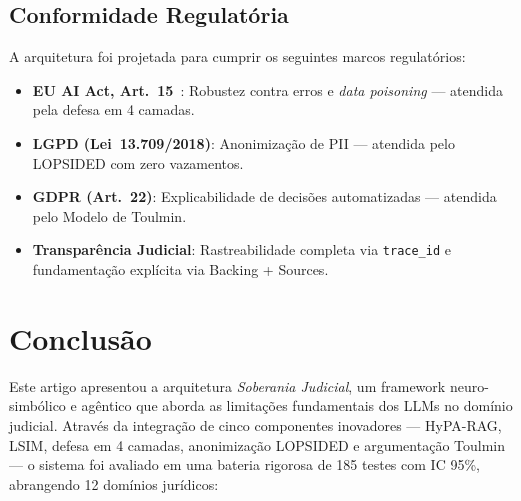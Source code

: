 \documentclass[journal,10pt]{IEEEtran}
\begin{document}
\subsection{Conformidade Regulat\'{o}ria}

A arquitetura foi projetada para cumprir os seguintes marcos regulat\'{o}rios:

\begin{itemize}    \item \textbf{EU AI Act, Art.~15}~\cite{euaiact2024,euaiactsd2024}: Robustez contra erros e \textit{data poisoning} --- atendida pela defesa em 4 camadas.
    \item \textbf{LGPD (Lei~13.709/2018)}: Anonimiza\c{c}\~{a}o de PII --- atendida pelo LOPSIDED com zero vazamentos.
    \item \textbf{GDPR (Art.~22)}: Explicabilidade de decis\~{o}es automatizadas --- atendida pelo Modelo de Toulmin.
    \item \textbf{Transpar\^{e}ncia Judicial}: Rastreabilidade completa via \texttt{trace\_id} e fundamenta\c{c}\~{a}o expl\'{i}cita via Backing + Sources.
\end{itemize}

\section{Conclus\~{a}o}

Este artigo apresentou a arquitetura \textit{Soberania Judicial}, um framework neuro-simb\'{o}lico e ag\^{e}ntico que aborda as limita\c{c}\~{o}es fundamentais dos LLMs no dom\'{i}nio judicial. Atrav\'{e}s da integra\c{c}\~{a}o de cinco componentes inovadores --- HyPA-RAG, LSIM, defesa em 4 camadas, anonimiza\c{c}\~{a}o LOPSIDED e argumenta\c{c}\~{a}o Toulmin --- o sistema foi avaliado em uma bateria rigorosa de 185 testes com IC 95\%, abrangendo 12 dom\'{i}nios jur\'{i}dicos:
\end{document}
